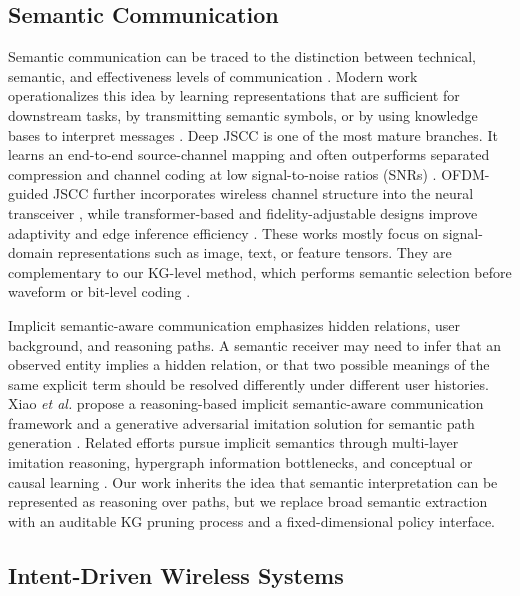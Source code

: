 \documentclass[journal]{IEEEtran}
\begin{document}
\subsection{Semantic Communication}

Semantic communication can be traced to the distinction between technical, semantic, and effectiveness levels of communication \cite{shannonweaver1949}. Modern work operationalizes this idea by learning representations that are sufficient for downstream tasks, by transmitting semantic symbols, or by using knowledge bases to interpret messages \cite{nguyen2025survey,zhang2020semantics,fang2026cross}. Deep JSCC is one of the most mature branches. It learns an end-to-end source-channel mapping and often outperforms separated compression and channel coding at low signal-to-noise ratios (SNRs) \cite{bourtsoulatze2019deep}. OFDM-guided JSCC further incorporates wireless channel structure into the neural transceiver \cite{yang2022ofdm}, while transformer-based and fidelity-adjustable designs improve adaptivity and edge inference efficiency \cite{yang2025swinjscc,devoto2026token,li2023fast}. These works mostly focus on signal-domain representations such as image, text, or feature tensors. They are complementary to our KG-level method, which performs semantic selection before waveform or bit-level coding \cite{gunduz2025jscc,kurka2020feedback,bourtsoulatze2019deep}.

Implicit semantic-aware communication emphasizes hidden relations, user background, and reasoning paths. A semantic receiver may need to infer that an observed entity implies a hidden relation, or that two possible meanings of the same explicit term should be resolved differently under different user histories. Xiao \emph{et al.} propose a reasoning-based implicit semantic-aware communication framework and a generative adversarial imitation solution for semantic path generation \cite{xiao2024reasoning}. Related efforts pursue implicit semantics through multi-layer imitation reasoning, hypergraph information bottlenecks, and conceptual or causal learning \cite{xiao2023imitation,liao2026hypergraph,wheeler2025causal}. Our work inherits the idea that semantic interpretation can be represented as reasoning over paths, but we replace broad semantic extraction with an auditable KG pruning process and a fixed-dimensional policy interface.

\subsection{Intent-Driven Wireless Systems}
\end{document}
